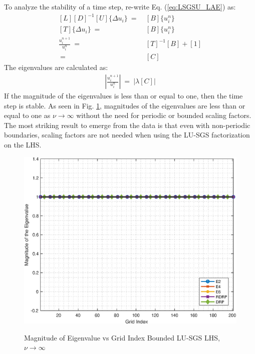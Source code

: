 \documentclass[conf]{new-aiaa}
\begin{document}
To analyze the stability of a time step, re-write Eq. (\ref{eq:LSGSU_LAE}) as:
\begin{equation}
\label{eq:AB}
	\begin{split}
  		[L][D]^{-1}[U]\{\Delta{u_i\}}~=&~[B]\{u_i^{n}\} \\
  		[T]\{\Delta{u_i\}}~=&~[B]\{u_i^{n}\} \\
  		\frac{u_i^{n+1}}{u_i^{n}}~=&~[T]^{-1}[B] + [1] \\
  		~=&~[C]
	\end{split}
\end{equation}
The eigenvalues are calculated as:
\begin{equation}
	\begin{split}
		\label{eq:Magnitude_Of_Eigen}
  			\left|\frac{u_i^{n+1}}{u_i^{n}}\right|~=~\left|\lambda\left[C\right]\right|
	\end{split}
\end{equation}
If the magnitude of the eigenvalues is less than or equal to one, then the time step is stable.  
As seen in Fig. \ref{fig:LUSGS_index_vs_mag_Scaling_Bounded}, magnitudes of the eigenvalues are less than or equal to one as $\nu\to\infty$ without the need for periodic or bounded scaling factors. 
The most striking result to emerge from the data is that even with non-periodic boundaries, scaling factors are not needed when using the LU-SGS factorization on the LHS. 



\begin{figure}[hbtp!]
	\centering
	{\includegraphics[width=.7\textwidth]{Figures/LUSGS_index_vs_mag_ScaleFactor_Periodic}}
	\caption{Magnitude of Eigenvalue vs Grid Index
	Bounded LU-SGS LHS, $\nu\to\infty$}
	\label{fig:LUSGS_index_vs_mag_Scaling_Bounded}
\end{figure}
\end{document}
